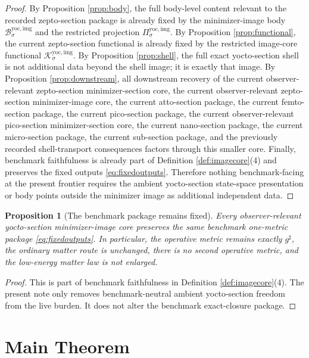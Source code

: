 \documentclass[11pt]{article}
\newcommand{\CompletedMetric}{g^{\sharp}}
\newcommand{\YoctoImgBody}[1]{\mathcal B_{#1}^{\mathrm{yoc,img}}}
\newcommand{\YoctoImgProj}[1]{\Pi_{#1}^{\mathrm{yoc,img}}}
\newcommand{\YoctoImgFunctional}[1]{\mathscr K_{#1}^{\mathrm{yoc,img}}}
\newtheorem{proposition}{Proposition}
\begin{document}
\begin{proof}
By Proposition \ref{prop:body}, the full body-level content relevant to the recorded zepto-section package is already fixed by the minimizer-image body \(\YoctoImgBody{\sigma}\) and the restricted projection \(\YoctoImgProj{\sigma}\). By Proposition \ref{prop:functional}, the current zepto-section functional is already fixed by the restricted image-core functional \(\YoctoImgFunctional{\sigma}\). By Proposition \ref{prop:shell}, the full exact yocto-section shell is not additional data beyond the shell image; it is exactly that image. By Proposition \ref{prop:downstream}, all downstream recovery of the current observer-relevant zepto-section minimizer-section core, the current observer-relevant zepto-section minimizer-image core, the current atto-section package, the current femto-section package, the current pico-section package, the current observer-relevant pico-section minimizer-section core, the current nano-section package, the current micro-section package, the current sub-section package, and the previously recorded shell-transport consequences factors through this smaller core. Finally, benchmark faithfulness is already part of Definition \ref{def:imagecore}(4) and preserves the fixed outputs \eqref{eq:fixedoutputs}. Therefore nothing benchmark-facing at the present frontier requires the ambient yocto-section state-space presentation or body points outside the minimizer image as additional independent data.
\end{proof}

\begin{proposition}[The benchmark package remains fixed]
\label{prop:benchmark}
Every observer-relevant yocto-section minimizer-image core preserves the same benchmark one-metric package \eqref{eq:fixedoutputs}. In particular, the operative metric remains exactly \(\CompletedMetric\), the ordinary matter route is unchanged, there is no second operative metric, and the low-energy matter law is not enlarged.
\end{proposition}

\begin{proof}
This is part of benchmark faithfulness in Definition \ref{def:imagecore}(4). The present note only removes benchmark-neutral ambient yocto-section freedom from the live burden. It does not alter the benchmark exact-closure package.
\end{proof}

\section{Main Theorem}
\end{document}
